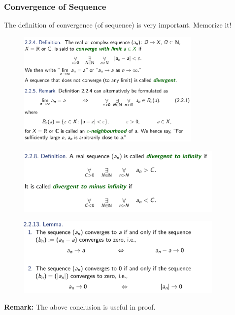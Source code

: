 \documentclass[10pt, t]{beamer}
\begin{document}
\begin{frame}[allowframebreaks]
    \frametitle{Convergence of Sequence}
    The definition of convergence (of sequence) is very important. Memorize it!
    \newpage
    \begin{figure}[H]
        \centering
        \includegraphics[width=0.8\textwidth]{2020-09-30-13-54-19.png}
    \end{figure}
    \newpage
    \begin{figure}[H]
        \centering
        \includegraphics[width=0.9\textwidth]{2020-09-30-14-14-20.png}
    \end{figure}
    \begin{figure}[H]
        \centering
        \includegraphics[width=0.9\textwidth]{2020-09-30-14-19-17.png}
    \end{figure}
    \textbf{Remark:} The above conclusion is useful in proof.
\end{frame}
\end{document}
